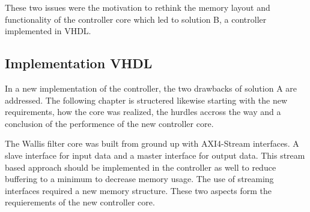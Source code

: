 \vspace{1ex}
These two issues were the motivation to rethink the memory layout and
functionality of the controller core which led to solution B, a controller
implemented in VHDL.




\subsection{Implementation VHDL} \label{ch:controller:vhdl}
In a new implementation of the controller, the two drawbacks of solution A are
addressed. The following chapter is structered likewise starting with the new
requirements, how the core was realized, the hurdles accross the way and a
conclusion of the performence of the new controller core.

The Wallis filter core was built from ground up with AXI4-Stream interfaces. A
slave interface for input data and a master interface for output data. This
stream based approach should be implemented in the controller as well to reduce
buffering to a minimum to decrease memory usage. The use of streaming interfaces
required a new memory structure. These two aspects form the requierements of the
new controller core.

